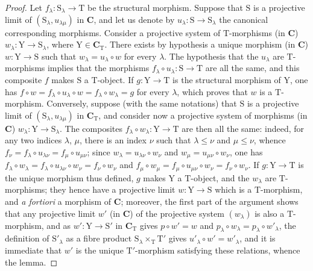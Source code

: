\begin{proof}
Let $f_\lambda:\mathrm{S}_\lambda\to\mathrm{T}$ be the structural morphism.
Suppose that $\mathrm{S}$ is a projective limit of $(\mathrm{S}_\lambda,u_{\lambda\mu})$ in $\mathbf{C}$, and let us denote by $u_\lambda:\mathrm{S}\to\mathrm{S}_\lambda$ the canonical corresponding morphisms.
Consider a projective system of $\mathrm{T}$-morphisms (in $\mathbf{C}$) $w_\lambda:\mathrm{Y}\to\mathrm{S}_\lambda$, where $\mathrm{Y}\in\mathbf{C}_\mathrm{T}$.
There exists by hypothesis a unique morphism (in $\mathbf{C}$) $w:\mathrm{Y}\to\mathrm{S}$ such that $w_\lambda=u_\lambda\circ w$ for every $\lambda$.
The hypothesis that the $u_\lambda$ are $\mathrm{T}$-morphisms implies that the morphisms $f_\lambda\circ u_\lambda:\mathrm{S}\to\mathrm{T}$ are all the same, and this composite $f$ makes $\mathrm{S}$ a $\mathrm{T}$-object.
If $g:\mathrm{Y}\to\mathrm{T}$ is the structural morphism of $\mathrm{Y}$, one has $f\circ w=f_\lambda\circ u_\lambda\circ w=f_\lambda\circ w_\lambda=g$ for every $\lambda$, which proves that $w$ is a $\mathrm{T}$-morphism.
Conversely, suppose (with the same notations) that $\mathrm{S}$ is a projective limit of $(\mathrm{S}_\lambda,u_{\lambda\mu})$ in $\mathbf{C}_\mathrm{T}$, and consider now a projective system of morphisms (in $\mathbf{C}$) $w_\lambda:\mathrm{Y}\to\mathrm{S}_\lambda$.
The composites $f_\lambda\circ w_\lambda:\mathrm{Y}\to\mathrm{T}$ are then all the same: indeed, for any two indices $\lambda$, $\mu$, there is an index $\nu$ such that $\lambda\leqslant\nu$ and $\mu\leqslant\nu$, whence $f_\nu=f_\lambda\circ u_{\lambda\nu}=f_\mu\circ u_{\mu\nu}$; since $w_\lambda=u_{\lambda\nu}\circ w_\nu$ and $w_\mu=u_{\mu\nu}\circ w_\nu$, one has $f_\lambda\circ w_\lambda=f_\lambda\circ u_{\lambda\nu}\circ w_\nu=f_\nu\circ w_\nu$ and $f_\mu\circ w_\mu=f_\mu\circ u_{\mu\nu}\circ w_\nu=f_\nu\circ w_\nu$.
If $g:\mathrm{Y}\to\mathrm{T}$ is the unique morphism thus defined, $g$ makes $\mathrm{Y}$ a $\mathrm{T}$-object, and the $w_\lambda$ are $\mathrm{T}$-morphisms; they hence have a projective limit $w:\mathrm{Y}\to\mathrm{S}$ which is a $\mathrm{T}$-morphism, and \emph{a fortiori} a morphism of $\mathbf{C}$; moreover, the first part of the argument shows that any projective limit $w'$ (in $\mathbf{C}$) of the projective system $(w_\lambda)$ is also a $\mathrm{T}$-morphism, and as $w':\mathrm{Y}\to\mathrm{S}'$ in $\mathbf{C}_\mathrm{T}$ gives $p\circ w'=w$ and $p_\lambda\circ w_\lambda=p_\lambda\circ w'_\lambda$, the definition of $\mathrm{S}'_\lambda$ as a fibre product $\mathrm{S}_\lambda\times_\mathrm{T}\mathrm{T}'$ gives $u'_\lambda\circ w'=w'_\lambda$, and it is immediate that $w'$ is the unique $\mathrm{T}'$-morphism satisfying these relations, whence the lemma.
\end{proof}

